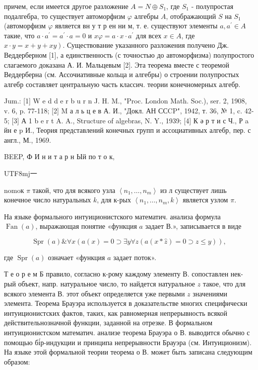\documentclass[10pt]{article}
\begin{document}
причем, если имеется другое разложение $A=N \oplus S_{1}$, где $S_{1}$ - полупростая подалгебра, то существует автоморфизм $\varphi$ алгебры $A$, отображающий $S$ на $S_{1}$ (автоморфизм $\varphi$ является вн у т р ен ни м, т. е. существуют элементы $a, a^{\prime} \in A$ такие, что $a \cdot a^{\prime}=a^{\prime} \cdot a=0$ и $x \varphi=a \cdot x \cdot a^{\prime}$ для всех $x \in A$, где $\left.x \cdot y=x+y+x y\right)$. Существование указанного разложения получено Дж. Веддерберном [1], а единственность (с точностью до автоморфизма) полупростого слагаемого доказана А. И. Мальцевым [2]. Эта теорема вместе с теоремой Веддерберна (см. Ассочиативные кольца и алгебры) о строении полупростых алгебр составляет центральную часть классич. теории конечномерных алгебр.



Jum.: [1] W e d d e r b u r n J. H. M., "Proc. London Math. Soc.), ser. 2, 1908, v. 6, p. 77-118; [2] M а л ь ц е в А. И., "Докл. АН ССCP", 1942, т. 36, № 1, c. 42-5; [3] А 1 b e r t A. A., Structure of algebras, N. Y., 1939; [4] К ә р т и с Ч., Р a йн е p И., Теория представлений конечных групп и ассоциативных алгебр, пер. с англ., М., 1969.



BEEP, Ф И н и т а р н Ый по т о к, \begin{CJK}{UTF8}{mj}一\end{CJK}nomoк $\pi$ такой, что для всякого узла $\left\langle n_{1}, \ldots, n_{m}\right\rangle$ из л существует лишь конечное число натуральных $k$, для к-рых $\left\langle n_{1}, \ldots, n_{m}, k\right\rangle$ является узлом $\pi$.



На языке формального интуиционистского математич. анализа формула $\operatorname{Fan}(a)$, выражающая понятие «функция $a$ задает В.», записывается в виде



\[

\operatorname{Spr}(a) \& \forall x(a(x)=0 \supset \exists y \forall z(a(x * \hat{z})=0 \supset z \leqslant y)),

\]



где $\operatorname{Spr}(a)$ означает «функция $a$ задает поток».



Т е о р е м Б правило, согласно к-рому каждому элементу В. сопоставлен нек-рый объект, напр. натуральное число, то найдется натуральное $z$ такое, что для всякого элемента В. этот объект определяется уже первыми $z$ значениями элемента. Теорема Брауэра используется в доказательстве многих специфически интуиционистских фактов, таких, как равномерная непрерывность всякой действительнозначной функции, заданной на отрезке. В формальном интуиционистском математич. анализе теорема Брауэра о В. выводится обычно с помощью бі́р-индукции и принципа непрерывности Брауэра (см. Интуиционизм). На языке этой формальной теории теорема о В. может быть записана следующим образом:
\end{document}
